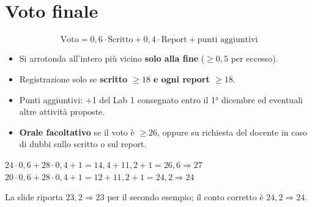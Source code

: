\section{Voto finale}
\[
\text{Voto} = 0{,}6 \cdot \text{Scritto} + 0{,}4 \cdot \overline{\text{Report}} + \text{punti aggiuntivi}
\]
\begin{itemize}
  \item Si arrotonda all'intero più vicino \textbf{solo alla fine} ($\geq 0{,}5$ per eccesso).
  \item Registrazione solo se \textbf{scritto $\geq 18$} \textbf{e ogni report $\geq 18$}.
  \item Punti aggiuntivi: +1 del Lab 1 consegnato entro il 1° dicembre ed eventuali altre attività proposte.
  \item \textbf{Orale facoltativo} se il voto è $\geq 26$, oppure su richiesta del docente in caso
        di dubbi sullo scritto o sul report.
\end{itemize}

\begin{esempio}
$24 \cdot 0{,}6 + 28 \cdot 0{,}4 + 1 = 14{,}4 + 11{,}2 + 1 = 26{,}6 \Rightarrow 27$\\
$20 \cdot 0{,}6 + 28 \cdot 0{,}4 + 1 = 12 + 11{,}2 + 1 = 24{,}2 \Rightarrow 24$
\end{esempio}

\begin{attenzione}
La slide riporta $23{,}2 \Rightarrow 23$ per il secondo esempio; il conto corretto è
$24{,}2 \Rightarrow 24$.
\end{attenzione}

